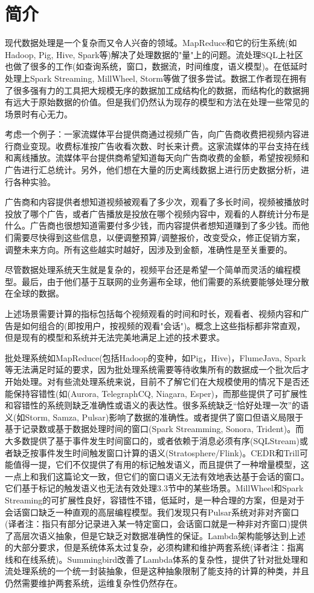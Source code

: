\documentclass[oneside]{ctexbook}
\begin{document}
\section{简介}

现代数据处理是一个复杂而又令人兴奋的领域。MapReduce和它的衍生系统(如Hadoop, Pig, Hive, Spark等)解决了处理数据的"量"上的问题。流处理SQL上社区也做了很多的工作(如查询系统，窗口，数据流，时间维度，语义模型)。在低延时处理上Spark Streaming, MillWheel, Storm等做了很多尝试。数据工作者现在拥有了很多强有力的工具把大规模无序的数据加工成结构化的数据，而结构化的数据拥有远大于原始数据的价值。但是我们仍然认为现存的模型和方法在处理一些常见的场景时有心无力。

考虑一个例子：一家流媒体平台提供商通过视频广告，向广告商收费把视频内容进行商业变现。收费标准按广告收看次数、时长来计费。这家流媒体的平台支持在线和离线播放。流媒体平台提供商希望知道每天向广告商收费的金额，希望按视频和广告进行汇总统计。另外，他们想在大量的历史离线数据上进行历史数据分析，进行各种实验。

广告商和内容提供者想知道视频被观看了多少次，观看了多长时间，视频被播放时投放了哪个广告，或者广告播放是投放在哪个视频内容中，观看的人群统计分布是什么。广告商也很想知道需要付多少钱，而内容提供者想知道赚到了多少钱。而他们需要尽快得到这些信息，以便调整预算/调整报价，改变受众，修正促销方案，调整未来方向。所有这些越实时越好，因涉及到金额，准确性是至关重要的。

尽管数据处理系统天生就是复杂的，视频平台还是希望一个简单而灵活的编程模型。最后，由于他们基于互联网的业务遍布全球，他们需要的系统要能够处理分散在全球的数据。

上述场景需要计算的指标包括每个视频观看的时间和时长，观看者、视频内容和广告是如何组合的(即按用户，按视频的观看"会话")。概念上这些指标都非常直观，但是现有的模型和系统并无法完美地满足上述的技术要求。

批处理系统如MapReduce(包括Hadoop的变种，如Pig，Hive)，FlumeJava, Spark等无法满足时延的要求，因为批处理系统需要等待收集所有的数据成一个批次后才开始处理。对有些流处理系统来说，目前不了解它们在大规模使用的情况下是否还能保持容错性(如(Aurora, TelegraphCQ, Niagara, Esper)，而那些提供了可扩展性和容错性的系统则缺乏准确性或语义的表达性。很多系统缺乏“恰好处理一次”的语义(如Storm, Samza, Pulsar)影响了数据的准确性。或者提供了窗口但语义局限于基于记录数或基于数据处理时间的窗口(Spark Streamming, Sonora, Trident)。而大多数提供了基于事件发生时间窗口的，或者依赖于消息必须有序(SQLStream)或者缺乏按事件发生时间触发窗口计算的语义(Stratosphere/Flink)。CEDR和Trill可能值得一提，它们不仅提供了有用的标记触发语义，而且提供了一种增量模型，这一点上和我们这篇论文一致，但它们的窗口语义无法有效地表达基于会话的窗口。它们基于标记的触发语义也无法有效处理3.3节中的某些场景。MillWheel和Spark Streaming的可扩展性良好，容错性不错，低延时，是一种合理的方案，但是对于会话窗口缺乏一种直观的高层编程模型。我们发现只有Pulsar系统对非对齐窗口(译者注：指只有部分记录进入某一特定窗口，会话窗口就是一种非对齐窗口)提供了高层次语义抽象，但是它缺乏对数据准确性的保证。Lambda架构能够达到上述的大部分要求，但是系统体系太过复杂，必须构建和维护两套系统(译者注：指离线和在线系统)。Summingbird改善了Lambda体系的复杂性，提供了针对批处理和流处理系统的一个统一封装抽象，但是这种抽象限制了能支持的计算的种类，并且仍然需要维护两套系统，运维复杂性仍然存在。
\end{document}
